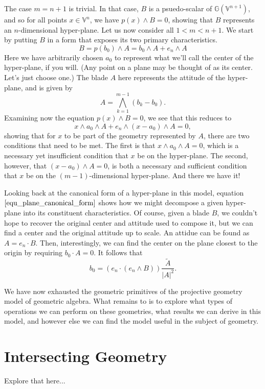 \documentclass[12pt]{article}
\newcommand{\G}{\mathbb{G}}
\newcommand{\V}{\mathbb{V}}
\begin{document}
The case $m=n+1$ is trivial.  In that case, $B$ is a psuedo-scalar of $\G(\V^{n+1})$, and
so for all points $x\in\V^n$, we have $p(x)\wedge B=0$, showing that $B$ represents
an $n$-dimensional hyper-plane.  Let us now consider all $1<m<n+1$.  We start by
putting $B$ in a form that exposes its two primary characteristics.
\begin{equation}\label{equ_plane_canonical_form}
B = p(b_0)\wedge A = b_0\wedge A + e_n\wedge A
\end{equation}
Here we have arbitrarily chosen $a_0$ to represent what we'll call the center of the hyper-plane, if you will.
(Any point on a plane may be thought of as its center.  Let's just choose one.)  The blade $A$ here
represents the attitude of the hyper-plane, and is given by
\begin{equation*}
A = \bigwedge_{k=1}^{m-1}(b_k-b_0).
\end{equation*}
Examining now the equation $p(x)\wedge B=0$, we see that this reduces to
\begin{equation*}
x\wedge a_0\wedge A + e_n\wedge (x-a_0)\wedge A = 0,
\end{equation*}
showing that for $x$ to be part of the geometry represented by $A$, there are two
conditions that need to be met.  The first is that $x\wedge a_0\wedge A=0$, which is
a necessary yet insufficient condition that $x$ be on the hyper-plane.  The second,
however, that $(x-a_0)\wedge A=0$, is both a necessary and sufficient condition
that $x$ be on the $(m-1)$-dimensional hyper-plane.  And there we have it!

Looking back at the canonical form of a hyper-plane in this model,
equation $\eqref{equ_plane_canonical_form}$ shows how we might decompose
a given hyper-plane into its constituent characteristics.  Of course, given
a blade $B$, we couldn't hope to recover the original center and attitude
used to compose it, but we can find a center and the original attitude up to scale.
An attidue can be found as $A=e_n\cdot B$.  Then, interestingly, we can find
the center on the plane closest to the origin by requiring $b_0\cdot A=0$.
It follows that
\begin{equation*}
b_0 = (e_n\cdot(e_n\wedge B))\frac{\tilde{A}}{|A|^2}.
\end{equation*}

We have now exhausted the geometric primitives of the projective geometry model
of geometric algebra.  What remains to is to explore what types of operations we
can perform on these geometries, what results we can derive in this model, and
however else we can find the model useful in the subject of geometry.

\section{Intersecting Geometry}

Explore that here...




\end{document}
